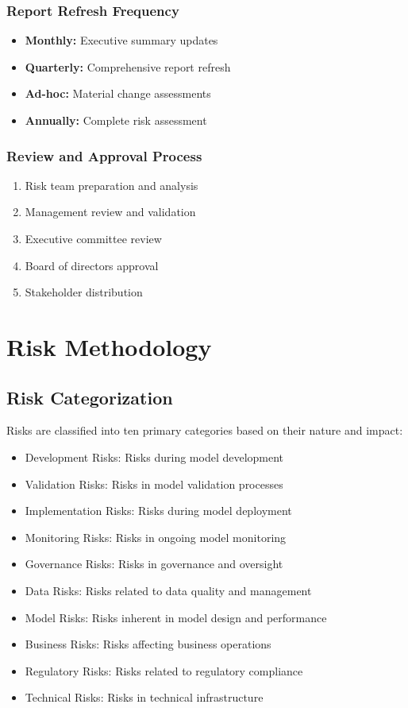 \documentclass[11pt,a4paper]{article}
\begin{document}
\subsubsection{Report Refresh Frequency}
\begin{itemize}
\item \textbf{Monthly:} Executive summary updates
\item \textbf{Quarterly:} Comprehensive report refresh
\item \textbf{Ad-hoc:} Material change assessments
\item \textbf{Annually:} Complete risk assessment
\end{itemize}

\subsubsection{Review and Approval Process}
\begin{enumerate}
\item Risk team preparation and analysis
\item Management review and validation
\item Executive committee review
\item Board of directors approval
\item Stakeholder distribution
\end{enumerate}

\newpage

\appendix

\section{Risk Methodology}

\subsection{Risk Categorization}
Risks are classified into ten primary categories based on their nature and impact:
\begin{itemize}
\item Development Risks: Risks during model development
\item Validation Risks: Risks in model validation processes
\item Implementation Risks: Risks during model deployment
\item Monitoring Risks: Risks in ongoing model monitoring
\item Governance Risks: Risks in governance and oversight
\item Data Risks: Risks related to data quality and management
\item Model Risks: Risks inherent in model design and performance
\item Business Risks: Risks affecting business operations
\item Regulatory Risks: Risks related to regulatory compliance
\item Technical Risks: Risks in technical infrastructure
\end{itemize}
\end{document}
